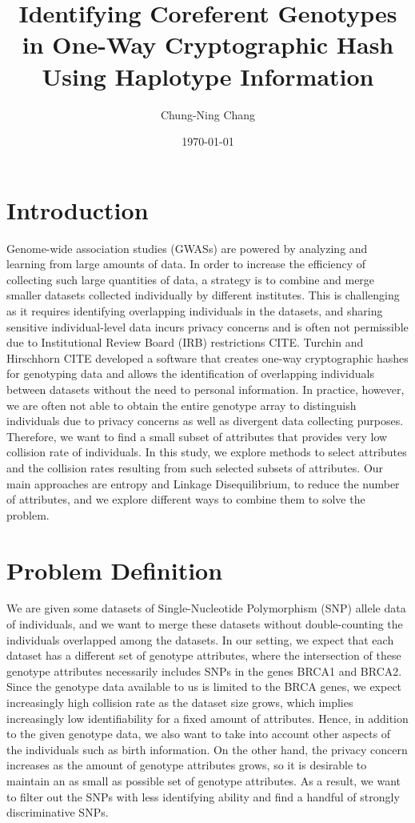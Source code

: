 \documentclass[14pt, oneside]{article}   	%
\title{Identifying Coreferent Genotypes in One-Way Cryptographic Hash Using Haplotype Information}
\author{Chung-Ning Chang}
\date{\today}							%
\begin{document}
\maketitle

\section{Introduction}
Genome-wide association studies (GWASs) are powered by analyzing and learning from large amounts of data.
In order to increase the efficiency of collecting such large quantities of data,
a strategy is to combine and merge smaller datasets collected individually by different institutes.
This is challenging as it requires identifying overlapping individuals in the datasets,
and sharing sensitive individual-level data incurs privacy concerns
and is often not permissible due to Institutional Review Board (IRB) restrictions CITE.
Turchin and Hirschhorn CITE developed a software that creates one-way cryptographic hashes for genotyping data
and allows the identification of overlapping individuals between datasets without the need to personal information.
In practice, however, we are often not able to obtain the entire genotype array to distinguish individuals
due to privacy concerns as well as divergent data collecting purposes.
Therefore, we want to find a small subset of attributes that provides very low collision rate of individuals.
In this study, we explore methods to select attributes and the collision rates resulting from such selected subsets of attributes.
Our main approaches are entropy and Linkage Disequilibrium, to reduce the number of attributes,
and we explore different ways to combine them to solve the problem.

\section{Problem Definition}
We are given some datasets of Single-Nucleotide Polymorphism (SNP) allele data of individuals,
and we want to merge these datasets without double-counting the individuals overlapped among the datasets.
In our setting, we expect that each dataset has a different set of genotype attributes,
where the intersection of these genotype attributes necessarily includes SNPs in the genes BRCA1 and BRCA2.
\\
Since the genotype data available to us is limited to the BRCA genes,
we expect increasingly high collision rate as the dataset size grows,
which implies increasingly low identifiability for a fixed amount of attributes.
Hence, in addition to the given genotype data, we also want to take into account other aspects of the individuals such as birth information.
%
On the other hand, the privacy concern increases as the amount of genotype attributes grows,
so it is desirable to maintain an as small as possible set of genotype attributes.
As a result, we want to filter out the SNPs with less identifying ability and find a handful of strongly discriminative SNPs.
\end{document}
